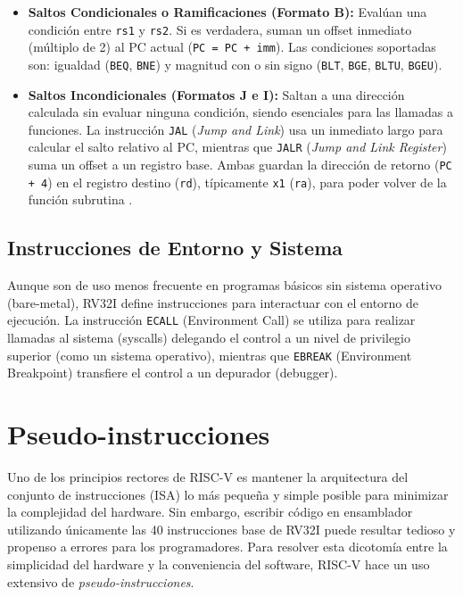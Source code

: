 \begin{itemize}
    \item \textbf{Saltos Condicionales o Ramificaciones (Formato B):} Evalúan una condición entre \texttt{rs1} y \texttt{rs2}. Si es verdadera, suman un offset inmediato (múltiplo de 2) al PC actual (\texttt{PC = PC + imm}). Las condiciones soportadas son: igualdad (\texttt{BEQ}, \texttt{BNE}) y magnitud con o sin signo (\texttt{BLT}, \texttt{BGE}, \texttt{BLTU}, \texttt{BGEU}).
    \item \textbf{Saltos Incondicionales (Formatos J e I):} Saltan a una dirección calculada sin evaluar ninguna condición, siendo esenciales para las llamadas a funciones. La instrucción \texttt{JAL} (\textit{Jump and Link}) usa un inmediato largo para calcular el salto relativo al PC, mientras que \texttt{JALR} (\textit{Jump and Link Register}) suma un offset a un registro base. Ambas guardan la dirección de retorno (\texttt{PC + 4}) en el registro destino (\texttt{rd}), típicamente \texttt{x1} (\texttt{ra}), para poder volver de la función subrutina \cite{waterman2014riscv}.
\end{itemize}

\subsection{Instrucciones de Entorno y Sistema}
Aunque son de uso menos frecuente en programas básicos sin sistema operativo (bare-metal), RV32I define instrucciones para interactuar con el entorno de ejecución. La instrucción \texttt{ECALL} (Environment Call) se utiliza para realizar llamadas al sistema (syscalls) delegando el control a un nivel de privilegio superior (como un sistema operativo), mientras que \texttt{EBREAK} (Environment Breakpoint) transfiere el control a un depurador (debugger).



\section{Pseudo-instrucciones}
\label{sec:Pseudoinstrucciones}

Uno de los principios rectores de RISC-V es mantener la arquitectura del conjunto de instrucciones (ISA) lo más pequeña y simple posible para minimizar la complejidad del hardware. Sin embargo, escribir código en ensamblador utilizando únicamente las 40 instrucciones base de RV32I puede resultar tedioso y propenso a errores para los programadores. Para resolver esta dicotomía entre la simplicidad del hardware y la conveniencia del software, RISC-V hace un uso extensivo de \textit{pseudo-instrucciones}.

